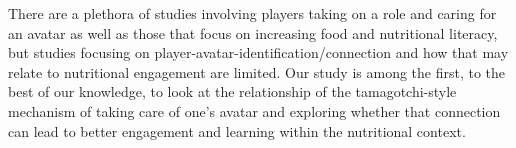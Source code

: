 There are a plethora of studies involving players taking on a role and caring for an avatar as well as those that focus on increasing food and nutritional literacy, but studies focusing on player-avatar-identification/connection and how that may relate to nutritional engagement are limited. Our study is among the first, to the best of our knowledge, to look at the relationship of the tamagotchi-style mechanism of taking care of one's avatar and exploring whether that connection can lead to better engagement and learning within the nutritional context. 






